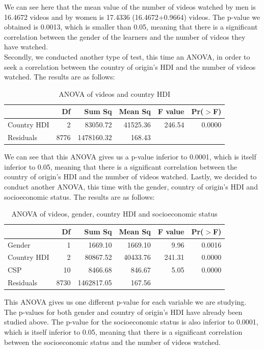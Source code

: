 \documentclass[12pt]{article}
\begin{document}
We can see here that the mean value of the number of videos watched by men is 16.4672 videos and by women is 17.4336 (16.4672+0.9664) videos. The p-value we obtained is 0.0013, which is smaller than 0.05, meaning that there is a significant correlation between the gender of the learners and the number of videos they have watched. \\
Secondly, we conducted another type of test, this time an ANOVA, in order to seek a correlation between the country of origin's HDI and the number of videos watched. The results are as follows:

\begin{table}[ht]
\centering
\begin{tabular}{lrrrrr}
  \hline
 & Df & Sum Sq & Mean Sq & F value & Pr($>$F) \\ 
  \hline
Country HDI & 2 & 83050.72 & 41525.36 & 246.54 & 0.0000 \\ 
  Residuals       & 8776 & 1478160.32 & 168.43 &  &  \\ 
   \hline
\end{tabular}
\caption{ANOVA of videos and country HDI}
\end{table}

We can see that this ANOVA gives us a p-value inferior to 0.0001, which is itself inferior to 0.05, meaning that there is a significant correlation between the country of origin's HDI and the number of videos watched. Lastly, we decided to conduct another ANOVA, this time with the gender, country of origin's HDI and socioeconomic status. The results are as follows:

\begin{table}[ht]
\centering
\begin{tabular}{lrrrrr}
  \hline
 & Df & Sum Sq & Mean Sq & F value & Pr($>$F) \\ 
  \hline
Gender & 1 & 1669.10 & 1669.10 & 9.96 & 0.0016 \\ 
  Country HDI & 2 & 80867.52 & 40433.76 & 241.31 & 0.0000 \\ 
  CSP & 10 & 8466.68 & 846.67 & 5.05 & 0.0000 \\ 
  Residuals & 8730 & 1462817.05 & 167.56 &  &  \\ 
   \hline
\end{tabular}
\caption{ANOVA of videos, gender, country HDI and socioeconomic status}
\end{table}

This ANOVA gives us one different p-value for each variable we are studying. The p-values for both gender and country of origin's HDI have already been studied above. The p-value for the socioeconomic status is also inferior to 0.0001, which is itself inferior to 0.05, meaning that there is a significant correlation between the socioeconomic status and the number of videos watched.
\end{document}
